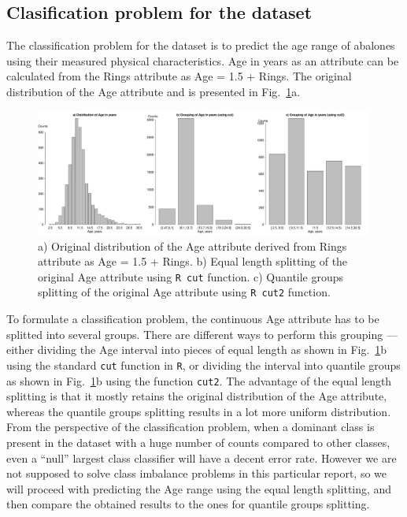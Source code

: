 \documentclass[10pt, paper=a4]{article}
\begin{document}

\subsection{Clasification problem for the dataset}  %
The classification problem for the dataset is to predict the age range
of abalones using their measured physical characteristics.  Age in
years as an attribute can be calculated from the Rings attribute as
Age = 1.5 + Rings.  The original distribution of the Age attribute and
is presented in Fig.~\ref{fig:age_grouping}a.

\begin{figure}[htbp]
  \centering \includegraphics[width =
    0.99\textwidth]{age_grouping.pdf} \cprotect\caption{a) Original
    distribution of the Age attribute derived from Rings attribute as
    Age = 1.5 + Rings.  b) Equal length splitting of the original Age
    attribute using \verb|R cut| function.  c) Quantile groups
    splitting of the original Age attribute using \verb|R cut2|
    function.}
  \label{fig:age_grouping}
\end{figure}

To formulate a classification problem, the continuous Age attribute
has to be splitted into several groups.  There are different ways to
perform this grouping --- either dividing the Age interval into pieces
of equal length as shown in Fig.~\ref{fig:age_grouping}b using the
standard \verb|cut| function in \verb|R|, or dividing the interval
into quantile groups as shown in Fig.~\ref{fig:age_grouping}b using
the function \verb|cut2|.  The advantage of the equal length splitting
is that it mostly retains the original distribution of the Age
attribute, whereas the quantile groups splitting results in a lot more
uniform distribution.  From the perspective of the classification
problem, when a dominant class is present in the dataset with a huge
number of counts compared to other classes, even a ``null'' largest
class classifier will have a decent error rate.  However we are not
supposed to solve class imbalance problems in this particular report,
so we will proceed with predicting the Age range using the equal
length splitting, and then compare the obtained results to the ones
for quantile groups splitting.
\end{document}
